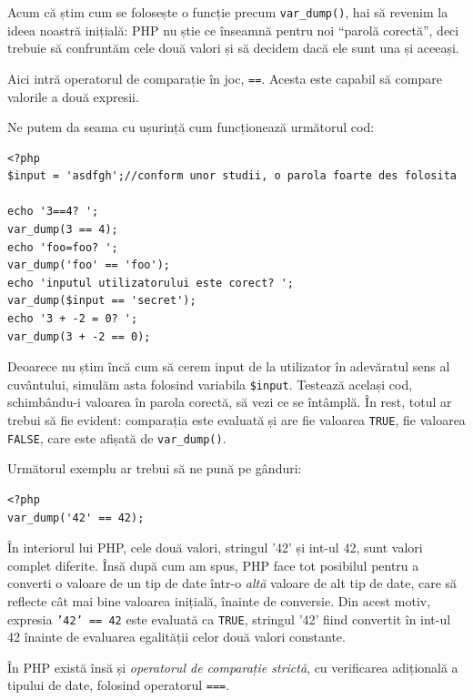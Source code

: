 Acum că știm cum se folosește o funcție precum \texttt{var\_dump()},
hai să revenim la ideea noastră inițială: PHP nu știe ce
înseamnă pentru noi ``parolă corectă'', deci trebuie să confruntăm
cele două valori și să decidem dacă ele sunt una și aceeași.

Aici intră operatorul de comparație în joc, \texttt{==}. Acesta
este capabil să compare valorile a două expresii.


Ne putem da seama cu ușurință cum funcționează următorul cod:
\begin{lstlisting}
<?php
$input = 'asdfgh';//conform unor studii, o parola foarte des folosita

echo '3==4? ';
var_dump(3 == 4);
echo 'foo=foo? ';
var_dump('foo' == 'foo');
echo 'inputul utilizatorului este corect? ';
var_dump($input == 'secret');
echo '3 + -2 = 0? ';
var_dump(3 + -2 == 0);
\end{lstlisting}

Deoarece nu știm încă cum să cerem input de la utilizator
în adevăratul sens al cuvântului, simulăm asta folosind variabila \texttt{\$input}.
Testează același cod, schimbându-i valoarea în parola corectă,
să vezi ce se întâmplă. În rest, totul ar trebui să fie evident: comparația
este evaluată și are fie valoarea \texttt{TRUE}, fie valoarea \texttt{FALSE},
care este afișată de \texttt{var\_dump()}.

Următorul exemplu ar trebui să ne pună pe gânduri:
\begin{lstlisting}
<?php
var_dump('42' == 42);
\end{lstlisting}
În interiorul lui PHP, cele două valori, stringul '42'
și int-ul 42, sunt valori complet diferite. Însă
după cum am spus, PHP face tot posibilul pentru a
converti o valoare de un tip de date într-o \textit{altă}
valoare de alt tip de date, care să reflecte cât mai bine
valoarea inițială, înainte de conversie.
Din acest motiv, expresia \texttt{'42' == 42} este evaluată
ca \texttt{TRUE}, stringul '42' fiind convertit în int-ul 42 înainte
de evaluarea egalității celor două valori constante.

În PHP există însă și \textsl{operatorul de comparație strictă}, cu
verificarea adițională a tipului de date, folosind operatorul
\texttt{===}.

